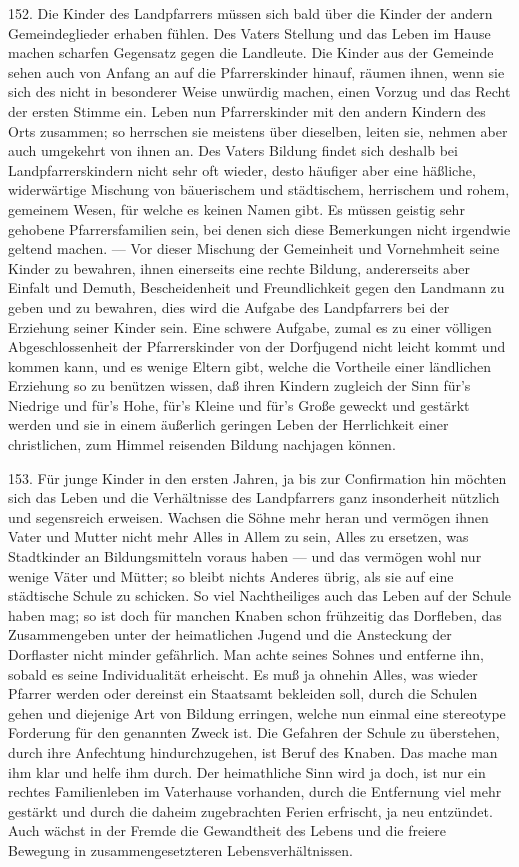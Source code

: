 152. Die Kinder des Landpfarrers müssen sich bald über die Kinder der andern Gemeindeglieder erhaben fühlen. Des Vaters Stellung und das Leben im Hause machen scharfen Gegensatz gegen die Landleute. Die Kinder aus der Gemeinde sehen auch von Anfang an auf die Pfarrerskinder hinauf, räumen ihnen, wenn sie sich des nicht in besonderer Weise unwürdig machen, einen Vorzug und das Recht der ersten Stimme ein. Leben nun Pfarrerskinder mit den andern Kindern des Orts zusammen; so herrschen sie meistens über dieselben, leiten sie, nehmen aber auch umgekehrt von ihnen an. Des Vaters Bildung findet sich deshalb bei Landpfarrerskindern nicht sehr oft wieder, desto häufiger aber eine häßliche, widerwärtige Mischung von bäuerischem und städtischem, herrischem und rohem, gemeinem Wesen, für welche es keinen Namen gibt. Es müssen geistig sehr gehobene Pfarrersfamilien sein, bei
denen sich diese Bemerkungen nicht irgendwie geltend machen. — Vor dieser Mischung der Gemeinheit und Vornehmheit seine Kinder zu bewahren, ihnen einerseits eine rechte Bildung, andererseits aber Einfalt und Demuth, Bescheidenheit und Freundlichkeit gegen den Landmann zu geben und zu bewahren, dies wird die Aufgabe des Landpfarrers bei der Erziehung seiner Kinder sein. Eine schwere Aufgabe, zumal es zu einer völligen Abgeschlossenheit der Pfarrerskinder von der Dorfjugend nicht leicht kommt und kommen kann, und es wenige Eltern gibt, welche die Vortheile einer ländlichen Erziehung so zu benützen wissen, daß ihren Kindern zugleich der Sinn für’s Niedrige und für’s Hohe, für’s Kleine und für’s Große geweckt und gestärkt werden und sie in einem äußerlich geringen Leben der Herrlichkeit einer christlichen, zum Himmel reisenden Bildung nachjagen können.

153. Für junge Kinder in den ersten Jahren, ja bis zur Confirmation hin möchten sich das Leben und die Verhältnisse des Landpfarrers ganz insonderheit nützlich und segensreich erweisen. Wachsen die Söhne mehr heran und vermögen ihnen Vater und Mutter nicht mehr Alles in Allem zu sein, Alles zu ersetzen, was Stadtkinder an Bildungsmitteln voraus haben — und das vermögen wohl nur wenige Väter und Mütter; so bleibt nichts Anderes übrig, als sie auf eine städtische Schule zu schicken. So viel Nachtheiliges auch das Leben auf der Schule haben mag; so ist doch für manchen Knaben schon frühzeitig das Dorfleben, das Zusammengeben unter der heimatlichen Jugend und die Ansteckung der Dorflaster nicht minder
gefährlich. Man achte seines Sohnes und entferne ihn, sobald es seine Individualität erheischt. Es muß ja ohnehin Alles, was wieder Pfarrer werden oder dereinst ein Staatsamt bekleiden soll, durch die Schulen gehen und diejenige Art von Bildung erringen, welche nun einmal eine stereotype Forderung für den genannten Zweck ist. Die Gefahren der Schule zu überstehen, durch ihre Anfechtung hindurchzugehen, ist Beruf des Knaben. Das mache man ihm klar und helfe ihm durch. Der heimathliche Sinn wird ja doch, ist nur ein rechtes Familienleben im Vaterhause vorhanden, durch die Entfernung viel mehr gestärkt und durch die daheim zugebrachten Ferien erfrischt, ja neu entzündet. Auch wächst in der Fremde die Gewandtheit des Lebens und die freiere Bewegung in zusammengesetzteren Lebensverhältnissen.

